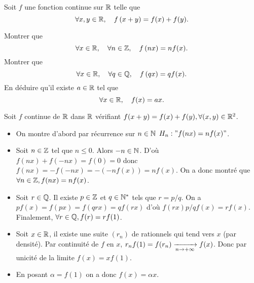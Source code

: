 \documentclass{magnolia}
\begin{document}
Soit $f$ une fonction continue sur $\mathbb{R}$ telle que
\[\forall x,y\in\mathbb{R} ,\quad f\left(x+y\right)=f(x)+f(y).\]
\begin{questions}
\question Montrer que
  \[\forall x\in\mathbb{R} ,\quad \forall n\in\mathbb{Z} ,\quad f\left(nx\right)=nf(x).\]
\question Montrer que
  \[\forall x\in\mathbb{R} ,\quad \forall q\in\mathbb{Q} ,\quad f\left(qx\right)=qf(x).\]
\question En déduire qu'il existe $a\in\mathbb{R}$ tel que
  \[\forall x\in\mathbb{R} ,\quad f(x)=ax.\]
\end{questions}

\begin{sol}
Soit $f$ continue de $\mathbb{R}$ dans $\mathbb{R}$ vérifiant $f(x+y)=f(x)+f(y), \forall (x,y)\in \mathbb{R}^2$.
  \begin{itemize}
  \item On montre d'abord par récurrence sur $n\in \mathbb{N}$ $H_n : "f(nx)=nf(x)"$.
  \item Soit $n\in \mathbb{Z}$ tel que $n\leq 0$. Alors $-n\in \mathbb{N}$. D'où $f(nx)+f(-nx)=f(0)=0$ donc $f(nx)=-f(-nx)=-(-nf(x))=nf(x)$. On a donc montré que $\forall n \in \mathbb{Z}, f(nx)=nf(x)$.
  \item Soit $r\in \mathbb{Q}$. Il existe $p\in \mathbb{Z}$ et $q\in {\mathbb{N}^*}$ tels que $r=p/q$. On a $pf(x)=f(px)=f(qrx)=qf(rx)$ d'où $f(rx)p/qf(x)=rf(x)$.
  Finalement, $\forall r\in \mathbb{Q}, f(r)=rf(1)$.
  \item Soit $x\in \mathbb{R}$, il existe une suite $(r_n)$ de rationnels qui tend vers $x$ (par densité). Par continuité de $f$ en $x$, $r_nf(1)=f(r_n)\xrightarrow[n\rightarrow +\infty]{}f(x)$. Donc par unicité de la limite $f(x)=xf(1)$.
  \item En posant $\alpha=f(1)$ on a donc $f(x)=\alpha x$.
  \end{itemize}
\end{sol}
\end{document}
